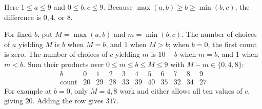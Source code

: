 Here $1\le a\le9$ and $0\le b,c\le9$. Because $\max(a,b)\ge b\ge\min(b,c)$, the difference is $0,4$, or $8$.

For fixed $b$, put $M=\max(a,b)$ and $m=\min(b,c)$. The number of choices of $a$ yielding $M$ is $b$ when $M=b$, and $1$ when $M>b$; when $b=0$, the first count is zero. The number of choices of $c$ yielding $m$ is $10-b$ when $m=b$, and $1$ when $m<b$. Sum their products over $0\le m\le b\le M\le9$ with $M-m\in\{0,4,8\}$:
\[
\begin{array}{c|rrrrrrrrrr}
b&0&1&2&3&4&5&6&7&8&9\\ \hline
\text{count}&20&29&28&33&39&40&35&32&34&27
\end{array}
\]
For example at $b=0$, only $M=4,8$ work and either allows all ten values of $c$, giving $20$. Adding the row gives $\boxed{317}$.
